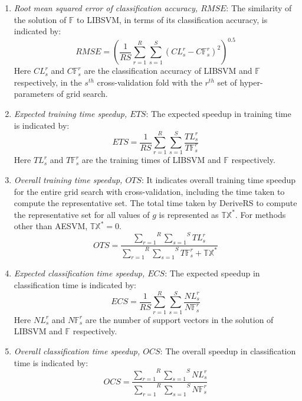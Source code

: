 \documentclass[twoside]{article}
\begin{document}
\begin{enumerate}\addtolength{\itemsep}{-.35\baselineskip}
	\item {\it Root mean squared error of classification accuracy, $RMSE$}: The similarity of the solution of $\mathbb{F}$ to LIBSVM, in terms of its classification accuracy, is indicated by:
	\begin{equation*}
	RMSE = \left(\frac{1}{RS}{\overset{R}{\underset{r = 1}{\sum}} \overset{S}{\underset{s = 1}{\sum}} (CL^r _s - C\mathbb{F}^r _s)^2}\right)^{0.5}
	\end{equation*}
		Here $CL^r _s$ and $C\mathbb{F}^r _s$ are the classification accuracy of LIBSVM and $\mathbb{F}$ respectively, in the $s^{th}$ cross-validation fold with the $r^{th}$ set of hyper-parameters of grid search.
		
	\item{\it Expected training time speedup, $ETS$}: The expected speedup in training time is indicated by:
	\begin{equation*}
	ETS = \frac{1}{RS}{\overset{R}{\underset{r = 1}{\sum}} \overset{S}{\underset{s = 1}{\sum}} \frac{TL^r _s}{T\mathbb{F}^r _s}}
	\end{equation*}
		Here $TL^r _s$ and $T\mathbb{F}^r _s$ are the training times of LIBSVM and $\mathbb{F}$ respectively.
		
	\item{\it Overall training time speedup, $OTS$}: It indicates overall training time speedup for the entire grid search with cross-validation, including the time taken to compute the representative set. The total time taken by DeriveRS to compute the representative set  for all values of $g$ is represented as $\mathbb{TX}^*$. For methods other than AESVM, $\mathbb{TX}^* = 0$.
	\begin{equation*}
	OTS = \frac{\overset{R}{\underset{r = 1}{\sum}} \overset{S}{\underset{s = 1}{\sum}}{TL^r _s}}{ \overset{R}{\underset{r = 1}{\sum}} \overset{S}{\underset{s = 1}{\sum}} T\mathbb{F}^r _s + \mathbb{TX}^*}
	\end{equation*}

	\item{\it Expected classification time speedup, $ECS$}: The expected speedup in classification time is indicated by:
	\begin{equation*}
	ECS = \frac{1}{RS}{\overset{R}{\underset{r = 1}{\sum}} \overset{S}{\underset{s = 1}{\sum}} \frac{NL^r _s}{N\mathbb{F}^r _s}}
	\end{equation*}
		Here $NL^r _s$ and $N\mathbb{F}^r _s$ are the number of support vectors in the solution of LIBSVM and $\mathbb{F}$ respectively.
	\item{\it Overall classification time speedup, $OCS$}: The overall speedup in classification time is indicated by:
	\begin{equation*}
	OCS = \frac{\overset{R}{\underset{r = 1}{\sum}} \overset{S}{\underset{s = 1}{\sum}}{NL^r _s}}{ \overset{R}{\underset{r = 1}{\sum}} \overset{S}{\underset{s = 1}{\sum}} N\mathbb{F}^r _s}
	\end{equation*}	
		
\end{enumerate}
\end{document}
